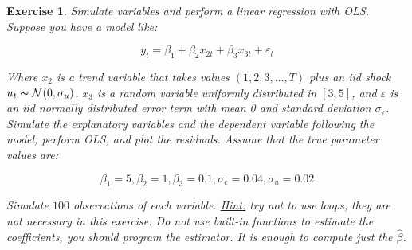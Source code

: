 \documentclass[a4paper,12pt]{article}
\newtheorem{exercise}{Exercise}
\begin{document}
\begin{exercise}
Simulate variables and perform a linear regression with OLS. Suppose you have a model like:
	
\[
y_t = \beta_1 + \beta_2 x_{2t} +\beta_3 x_{3t} +\varepsilon_t
\]
	
Where $x_2$ is a trend variable that takes values $(1,2,3,\ldots,T)$ plus an iid shock $u_t\thicksim \mathcal{N}(0,\sigma_u)$. $x_3$ is a random variable uniformly distributed in $[3, 5]$, and $\varepsilon$ is an iid normally distributed error term with mean 0 and standard deviation $\sigma_{\varepsilon}$. Simulate the explanatory variables and the dependent variable following the model, perform OLS, and plot the residuals. Assume that the true parameter values are:
	
\[
\beta_1 = 5, \beta_2 = 1, \beta_3 = 0.1, \sigma_e = 0.04, \sigma_u = 0.02
\]

Simulate $100$ observations of each variable. \underline{Hint:} try not to use loops, they are not necessary in this exercise. Do not use built-in functions to estimate the coefficients, you should program the estimator. It is enough to compute just the $\hat{\beta}$.
\end{exercise}
\end{document}
